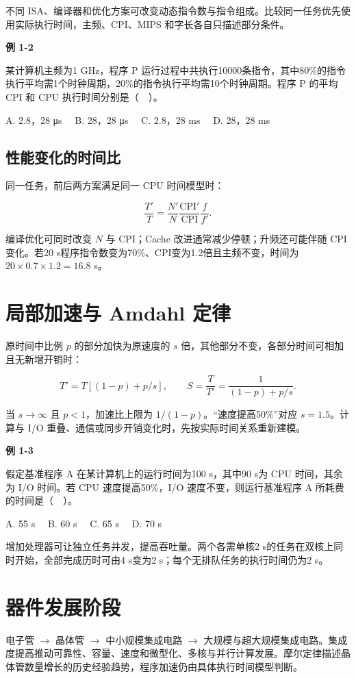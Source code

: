 不同 ISA、编译器和优化方案可改变动态指令数与指令组成。比较同一任务优先使用实际执行时间，主频、CPI、MIPS 和字长各自只描述部分条件。

\par\medskip{}\noindent\hypertarget{CO01-E02}{}\label{CO01-E02}\textbf{例 1-2}\par\nobreak\smallskip

某计算机主频为1 GHz，程序 P 运行过程中共执行10000条指令，其中80\%的指令执行平均需1个时钟周期，20\%的指令执行平均需10个时钟周期。程序 P 的平均 CPI 和 CPU 执行时间分别是（　）。

A. 2.8，28 μs　 B. 28，28 μs　 C. 2.8，28 ms　 D. 28，28 ms

\subsection{性能变化的时间比}\label{CO01-ratio}

同一任务，前后两方案满足同一 CPU 时间模型时：

\[\frac{T'}{T}=\frac{N'}N\frac{\mathrm{CPI}'}{\mathrm{CPI}}\frac f{f'}.\]

编译优化可同时改变 \(N\) 与 CPI；Cache 改进通常减少停顿；升频还可能伴随 CPI 变化。若20 s程序指令数变为70\%、CPI变为1.2倍且主频不变，时间为 \(20\times0.7\times1.2=16.8\) s。

\section{局部加速与 Amdahl 定律}\label{CO01-amdahl}

原时间中比例 \(p\) 的部分加快为原速度的 \(s\) 倍，其他部分不变，各部分时间可相加且无新增开销时：

\[T'=T[(1-p)+p/s],\qquad S=\frac T{T'}=\frac1{(1-p)+p/s}.\]

当 \(s\to\infty\) 且 \(p<1\)，加速比上限为 \(1/(1-p)\)。``速度提高50\%''对应 \(s=1.5\)。计算与 I/O 重叠、通信或同步开销变化时，先按实际时间关系重新建模。

\par\medskip{}\noindent\hypertarget{CO01-E03}{}\label{CO01-E03}\textbf{例 1-3}\par\nobreak\smallskip

假定基准程序 A 在某计算机上的运行时间为100 s，其中90 s为 CPU 时间，其余为 I/O 时间。若 CPU 速度提高50\%，I/O 速度不变，则运行基准程序 A 所耗费的时间是（　）。

A. 55 s　 B. 60 s　 C. 65 s　 D. 70 s

增加处理器可让独立任务并发，提高吞吐量。两个各需单核2 s的任务在双核上同时开始，全部完成历时可由4 s变为2 s；每个无排队任务的执行时间仍为2 s。

\section{器件发展阶段}\label{CO01-history}

电子管 \ensuremath{\to} 晶体管 \ensuremath{\to} 中小规模集成电路 \ensuremath{\to} 大规模与超大规模集成电路。集成度提高推动可靠性、容量、速度和微型化、多核与并行计算发展。摩尔定律描述晶体管数量增长的历史经验趋势，程序加速仍由具体执行时间模型判断。
